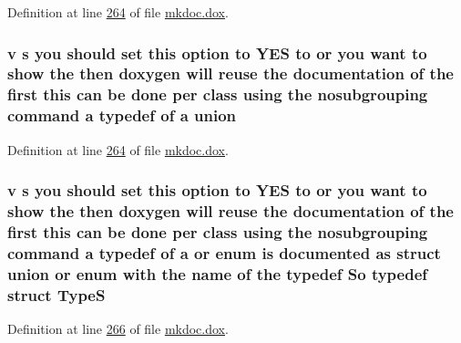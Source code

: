 Definition at line \hyperlink{mkdoc_8dox_source_l00264}{264} of file \hyperlink{mkdoc_8dox_source}{mkdoc.\-dox}.

\hypertarget{mkdoc_8dox_a68000add3c95d09ceb97c3079515907d}{
\subsubsection[{union}]{\setlength{\rightskip}{0pt plus 5cm}v s you should set this option to Y\-E\-S to or you want to show the then doxygen will reuse the documentation of the first this can be done per class using the nosubgrouping command a typedef of a union}}\label{mkdoc_8dox_a68000add3c95d09ceb97c3079515907d}


Definition at line \hyperlink{mkdoc_8dox_source_l00264}{264} of file \hyperlink{mkdoc_8dox_source}{mkdoc.\-dox}.

\hypertarget{mkdoc_8dox_a25dd1c015abaf1e4f2c6879012f4f170}{
\subsubsection[{Type\-S}]{\setlength{\rightskip}{0pt plus 5cm}v s you should set this option to Y\-E\-S to or you want to show the then doxygen will reuse the documentation of the first this can be done per class using the nosubgrouping command a typedef of a or enum is documented as {\bf struct} {\bf union} or enum with the name of the typedef So typedef {\bf struct} Type\-S}}\label{mkdoc_8dox_a25dd1c015abaf1e4f2c6879012f4f170}


Definition at line \hyperlink{mkdoc_8dox_source_l00266}{266} of file \hyperlink{mkdoc_8dox_source}{mkdoc.\-dox}.

